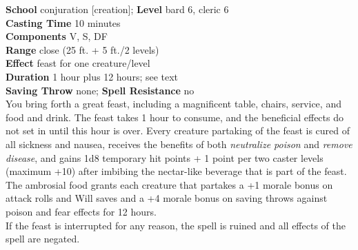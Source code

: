 \textbf{School }conjuration [creation]; \textbf{Level }bard 6, cleric 6\\
\textbf{Casting Time }10 minutes\\
\textbf{Components }V, S, DF\\
\textbf{Range }close (25 ft. + 5 ft./2 levels)\\
\textbf{Effect }feast for one creature/level\\
\textbf{Duration }1 hour plus 12 hours; see text\\
\textbf{Saving Throw} none; \textbf{Spell Resistance} no\\
You bring forth a great feast, including a magnificent table, chairs, service, and food and drink. The feast takes 1 hour to consume, and the beneficial effects do not set in until this hour is over. Every creature partaking of the feast is cured of all sickness and nausea, receives the benefits of both \textit{neutralize poison} and \textit{remove disease}, and gains 1d8 temporary hit points + 1 point per two caster levels (maximum +10) after imbibing the nectar-like beverage that is part of the feast. The ambrosial food grants each creature that partakes a +1 morale bonus on attack rolls and Will saves and a +4 morale bonus on saving throws against poison and fear effects for 12 hours.\\
If the feast is interrupted for any reason, the spell is ruined and all effects of the spell are negated.\\
